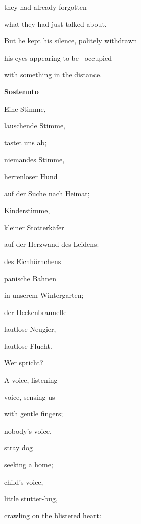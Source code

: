 \documentclass[a4paper]{article}
\begin{document}
they had already forgotten

what they had just talked about.


\bigskip

But he kept his silence, politely withdrawn

his eyes appearing to be \ occupied 

with something in the distance.

\clearpage
\bigskip

{\bfseries
Sostenuto}


\bigskip

Eine Stimme,

lauschende Stimme,

tastet uns ab;


\bigskip

niemandes Stimme,

herrenloser Hund

auf der Suche nach Heimat;


\bigskip

Kinderstimme,

kleiner Stotterkäfer

auf der Herzwand des Leidens:


\bigskip

des Eichhörnchens 

panische Bahnen

in unserem Wintergarten;


\bigskip

der Heckenbraunelle

lautlose Neugier,

lautlose Flucht.


\bigskip

Wer spricht?


\bigskip



\bigskip

A voice, listening 

voice, sensing us

with gentle fingers;


\bigskip

nobody’s voice,

stray dog

seeking a home;


\bigskip

child’s voice,

little stutter-bug,

crawling on the blistered heart:
\end{document}
